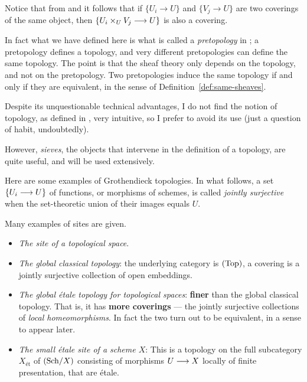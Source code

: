 \begin{2   CONTRAVARIANT FUNCTORS}
\begin{2.3 Sheaves in Grothendieck topologies}
Notice that from  and  it follows that if $\{U_i \to U\}$ and $\{V_j \to U\}$ are two coverings of the same object, then $\{U_i \times_U V_j \arr U\}$ is also a covering.

\begin{remark}
In fact what we have defined here is what is called a \emph{pretopology}%
 in \cite{sga4}; a pretopology defines a topology, and very different pretopologies can define the same topology. The point is that the sheaf theory only depends on the topology, and not on the pretopology. Two pretopologies induce the same topology if and only if they are equivalent, in the sense of Definition~\ref{def:same-sheaves}.

Despite its unquestionable technical advantages, I do not find the notion of topology, as defined in \cite{sga4}, very intuitive, so I prefer to avoid its use (just a question of habit, undoubtedly). 

However, \emph{sieves}, the objects that intervene in the definition of a topology, are quite useful, and will be used extensively.
\end{remark}

Here are some examples of Grothendieck topologies. In what follows, a set $\{U_{i} \arr U\}$ of functions, or morphisms of schemes, is called \emph{jointly surjective}%
 when the set-theoretic union of their images equals $U$.
\begin{shaded}
Many examples of sites are given.
\begin{itemize}\squishlist
\item \textit{The site of a topological space}.
\item \textit{The global classical topology}: the underlying category is $(\mathrm{Top})$, a covering is a jointly surjective collection of open embeddings.
\item \textit{The global \'etale topology for topological spaces}: \textbf{finer} than the global classical topology. That is, it has \textbf{more coverings} --- the jointly surjective collections of \emph{local homeomorphisms}. In fact the two turn out to be equivalent, in a sense to appear later.
\item \textit{The small \'etale site of a scheme $X$}:
This is a topology on the full subcategory $X_{\textrm{\'et}}$ of $({\mathrm{Sch}/X})$ consisting of morphisms $U \arr X$ locally of finite presentation, that are \'etale.


\end{itemize}
\end{shaded}
\end{2.3 Sheaves in Grothendieck topologies}
\end{2   CONTRAVARIANT FUNCTORS}
